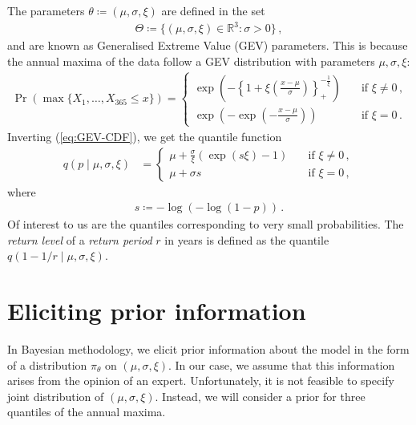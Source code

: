 \documentclass{article}
\newcommand{\R}{\mathbb{R}}
\begin{document}
%
The parameters $\theta \coloneqq (\mu, \sigma, \xi)$ are defined in the set
%
\begin{align}
	\Theta \coloneqq \{(\mu, \sigma, \xi) \in \R^3 \colon \sigma > 0 \} \,,
	\label{eq:Theta}
\end{align}
%
and are known as Generalised Extreme Value (GEV) parameters.
This is because the annual maxima of the data follow a GEV distribution
with parameters $\mu, \sigma, \xi$:
%
\begin{align}
	\Pr(\max\{X_1,\dots,X_{365}\leq x\}) =
		\begin{cases}
			\exp\left(-\left\{1 + \xi
			\left(\frac{x - \mu}{\sigma}\right)\right\}_+
			^ {-\frac{1}{\xi}}\right)
			&\quad \text{if $\xi \neq 0$} \,,\\
			\exp(-\exp(-\frac{x - \mu}{\sigma}))
			&\quad \text{if $\xi = 0$} \,.
		\end{cases}
	\label{eq:GEV-CDF}
\end{align}
%
Inverting (\ref{eq:GEV-CDF}), we get the quantile function
%
\begin{align*}
	q(p \mid \mu, \sigma, \xi) &=
	\begin{cases}
		\mu + \frac{\sigma}{\xi} (\exp(s \xi) - 1)
			&\quad \text{if $\xi \neq 0$}\,,\\
		\mu + \sigma s
			&\quad \text{if $\xi = 0$} \,,
	\end{cases}
\end{align*}
%
where
\begin{align*}
s \coloneqq -\log(-\log(1 - p))\,.
\end{align*}
%
Of interest to us are the quantiles corresponding to very small probabilities.
The \textit{return level} of a \textit{return period} $r$ in years
is defined as the quantile $q(1 - 1 / r\mid \mu, \sigma, \xi)$.
%
\section{Eliciting prior information}
\label{section:priors}
%
In Bayesian methodology, we elicit prior information about the model in the form
of a distribution $\pi_\theta$ on $(\mu, \sigma, \xi)$.
In our case, we assume that this information arises from the opinion of an expert.
Unfortunately, it is not feasible to specify joint distribution of $(\mu, \sigma, \xi)$.
Instead, we will consider a prior for three quantiles of the annual maxima.
%
\end{document}

